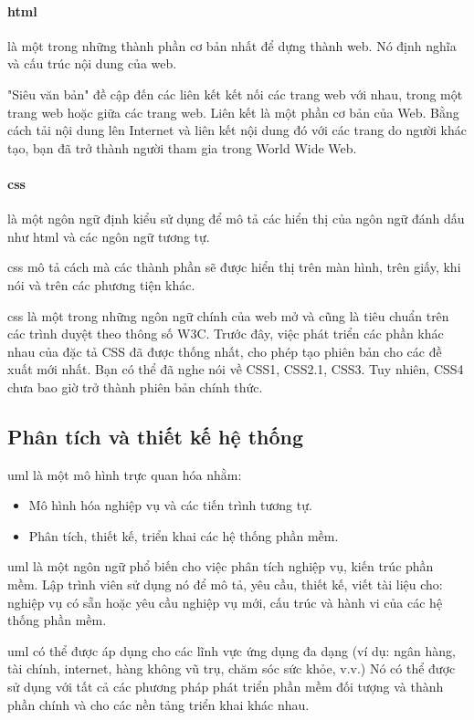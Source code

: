 \paragraph{\acrfull{html}} là một trong những thành phần cơ bản nhất để dựng thành web. Nó định nghĩa và cấu trúc nội dung của web.

"Siêu văn bản" đề cập đến các liên kết kết nối các trang web với nhau, trong một trang web hoặc giữa các trang web. Liên kết là một phần cơ bản của Web. Bằng cách tải nội dung lên Internet và liên kết nội dung đó với các trang do người khác tạo, bạn đã trở thành người tham gia trong World Wide Web.

\paragraph{\acrfull{css}} là một ngôn ngữ định kiểu sử dụng để mô tả các hiển thị của ngôn ngữ đánh dấu như \acrshort{html} và các ngôn ngữ tương tự. {\acrshort{css} mô tả cách mà các thành phần sẽ được hiển thị trên màn hình, trên giấy, khi nói và trên các phương tiện khác. {\acrshort{css} là một trong những ngôn ngữ chính của web mở và cũng là tiêu chuẩn trên các trình duyệt theo thông số W3C. Trước đây, việc phát triển các phần khác nhau của đặc tả CSS đã được thống nhất, cho phép tạo phiên bản cho các đề xuất mới nhất. Bạn có thể đã nghe nói về CSS1, CSS2.1, CSS3. Tuy nhiên, CSS4 chưa bao giờ trở thành phiên bản chính thức.

\subsection{Phân tích và thiết kế hệ thống}

\acrfull{uml} là một mô hình trực quan hóa nhằm:
\begin{itemize}
	\item Mô hình hóa nghiệp vụ và các tiến trình tương tự.
	\item Phân tích, thiết kế, triển khai các hệ thống phần mềm.
\end{itemize}
\acrfull{uml} là một ngôn ngữ phổ biến cho việc phân tích nghiệp vụ, kiến trúc phần mềm. Lập trình viên sử dụng nó để mô tả, yêu cầu, thiết kế, viết tài liệu cho: nghiệp vụ có sẵn hoặc yêu cầu nghiệp vụ mới, cấu trúc và hành vi của các hệ thống phần mềm.

\acrshort{uml} có thể được áp dụng cho các lĩnh vực ứng dụng đa dạng (ví dụ: ngân hàng, tài chính, internet, hàng không vũ trụ, chăm sóc sức khỏe, v.v.) Nó có thể được sử dụng với tất cả các phương pháp phát triển phần mềm đối tượng và thành phần chính và cho các nền tảng triển khai khác nhau.

}}
